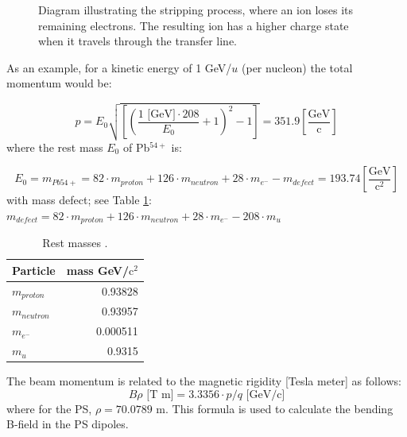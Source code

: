 \documentclass{cernatsnote}
\begin{document}
\begin{figure}
\begin{minipage}{0.45\textwidth}
        \caption{Diagram illustrating the stripping process, where an ion loses its remaining electrons. The resulting ion has a higher charge state when it travels through the transfer line.}
        \label{fig:stripping}
    \end{minipage}
\end{figure}

As an example, for a kinetic energy of 1 GeV/$u$ (per nucleon) the total momentum would be:

$$p = E_{0}\sqrt{\left [ \left( \frac{1\text{ [GeV]}\cdot 208}{E_{0}}+1\right )^{2}-1\right ]} = 351.9 \left[\frac{\text{GeV}}{\text{c}}\right]$$
where the rest mass $E_{0}$ of Pb$^{54+}$ is:

$$E_{0} = m_{Pb54+}= 82\cdot m_{proton} + 126\cdot m_{neutron} + 28\cdot m_{e^{-}} - m_{defect} = 193.74 \left[\frac{\text{GeV}}{\text{c}^{2}}\right]$$
with mass defect; see Table \ref{table:masses}: $m_{defect}=82\cdot m_{proton} + 126\cdot m_{neutron} + 28\cdot m_{e^{-}} - 208\cdot m_{u}$ 

\begin{table}[h!]
\centering
\caption{Rest masses \cite{boston_university_nuclear_nodate}.}
\begin{threeparttable}
\begin{tabular}{lr}
\toprule
Particle & mass GeV/$\text{c}^{2}$\\
\midrule
$m_{proton}$ & 0.93828      \\
$m_{neutron}$ & 0.93957      \\
$m_{e^{-}}$ & 0.000511 \\
$m_{u}$ & 0.9315       \\
\bottomrule
\end{tabular}
\label{table:masses}
\end{threeparttable}
\end{table}

The beam momentum is related to the magnetic rigidity [Tesla meter] as follows: 
$$B\rho \text{ [T m]} = 3.3356\cdot p/q \text{ [GeV/c]}$$
where for the PS, $\rho = 70.0789$ m. This formula is used to calculate the bending B-field in the PS dipoles.
\\
\end{document}
